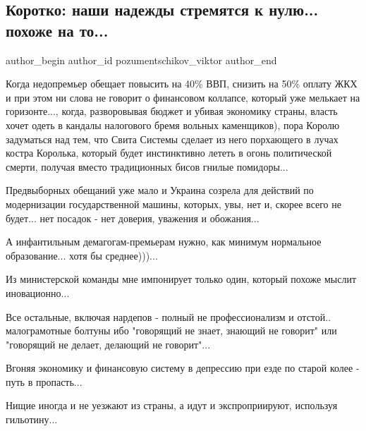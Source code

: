  
 
 
 
 
 
\subsection{Коротко: наши надежды стремятся к нулю... похоже на то...}
\label{sec:02_12_2019.fb.pozumentschikov_viktor.1.nadezhdy}
 
\ifcmt
 author_begin
   author_id pozumentschikov_viktor
 author_end
\fi

Когда недопремьер обещает повысить на 40\% ВВП, снизить на 50\% оплату ЖКХ и при
этом ни слова не говорит о финансовом коллапсе, который уже мелькает на
горизонте..., когда, разворовывая бюджет и убивая экономику страны, власть
хочет одеть в кандалы налогового бремя вольных каменщиков), пора Королю
задуматься над тем, что Свита Системы сделает из него порхающего в лучах костра
Королька, который будет инстинктивно лететь в огонь политической смерти,
получая вместо традиционных бисов гнилые помидоры... 

Предвыборных обещаний уже мало и Украина созрела для действий по модернизации
государственной машины, которых, увы, нет и, скорее всего не будет... нет
посадок - нет доверия, уважения и обожания...

А инфантильным демагогам-премьерам нужно, как минимум нормальное образование...
хотя бы среднее)))...

Из министерской команды мне импонирует только один, который похоже мыслит
иновационно...

Все остальные, включая нардепов - полный не профессионализм и отстой..
малограмотные болтуны ибо "говорящий не знает, знающий не говорит" или
"говорящий не делает, делающий не говорит"...

Вгоняя экономику и финансовую систему в депрессию при езде по старой колее -
путь в пропасть...

Нищие иногда и не уезжают из страны, а идут и экспроприируют, используя
гильотину...

